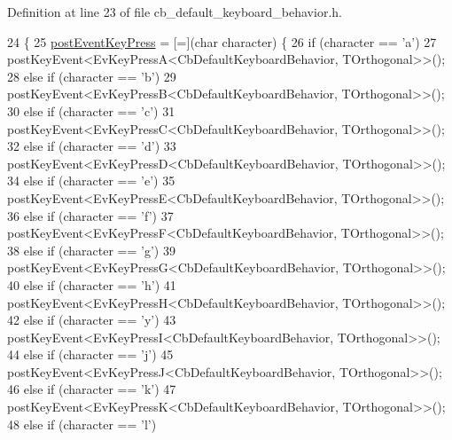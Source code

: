 Definition at line 23 of file cb\+\_\+default\+\_\+keyboard\+\_\+behavior.\+h.


\begin{DoxyCode}
24     \{
25         \hyperlink{classcl__keyboard_1_1CbDefaultKeyboardBehavior_abd29833a0f94aa1d5aa1834d15ab1281}{postEventKeyPress} = [=](\textcolor{keywordtype}{char} character) \{
26             \textcolor{keywordflow}{if} (character == \textcolor{charliteral}{'a'})
27                 postKeyEvent<EvKeyPressA<CbDefaultKeyboardBehavior, TOrthogonal>>();
28             \textcolor{keywordflow}{else} \textcolor{keywordflow}{if} (character == \textcolor{charliteral}{'b'})
29                 postKeyEvent<EvKeyPressB<CbDefaultKeyboardBehavior, TOrthogonal>>();
30             \textcolor{keywordflow}{else} \textcolor{keywordflow}{if} (character == \textcolor{charliteral}{'c'})
31                 postKeyEvent<EvKeyPressC<CbDefaultKeyboardBehavior, TOrthogonal>>();
32             \textcolor{keywordflow}{else} \textcolor{keywordflow}{if} (character == \textcolor{charliteral}{'d'})
33                 postKeyEvent<EvKeyPressD<CbDefaultKeyboardBehavior, TOrthogonal>>();
34             \textcolor{keywordflow}{else} \textcolor{keywordflow}{if} (character == \textcolor{charliteral}{'e'})
35                 postKeyEvent<EvKeyPressE<CbDefaultKeyboardBehavior, TOrthogonal>>();
36             \textcolor{keywordflow}{else} \textcolor{keywordflow}{if} (character == \textcolor{charliteral}{'f'})
37                 postKeyEvent<EvKeyPressF<CbDefaultKeyboardBehavior, TOrthogonal>>();
38             \textcolor{keywordflow}{else} \textcolor{keywordflow}{if} (character == \textcolor{charliteral}{'g'})
39                 postKeyEvent<EvKeyPressG<CbDefaultKeyboardBehavior, TOrthogonal>>();
40             \textcolor{keywordflow}{else} \textcolor{keywordflow}{if} (character == \textcolor{charliteral}{'h'})
41                 postKeyEvent<EvKeyPressH<CbDefaultKeyboardBehavior, TOrthogonal>>();
42             \textcolor{keywordflow}{else} \textcolor{keywordflow}{if} (character == \textcolor{charliteral}{'y'})
43                 postKeyEvent<EvKeyPressI<CbDefaultKeyboardBehavior, TOrthogonal>>();
44             \textcolor{keywordflow}{else} \textcolor{keywordflow}{if} (character == \textcolor{charliteral}{'j'})
45                 postKeyEvent<EvKeyPressJ<CbDefaultKeyboardBehavior, TOrthogonal>>();
46             \textcolor{keywordflow}{else} \textcolor{keywordflow}{if} (character == \textcolor{charliteral}{'k'})
47                 postKeyEvent<EvKeyPressK<CbDefaultKeyboardBehavior, TOrthogonal>>();
48             \textcolor{keywordflow}{else} \textcolor{keywordflow}{if} (character == \textcolor{charliteral}{'l'})

\end{DoxyCode}
